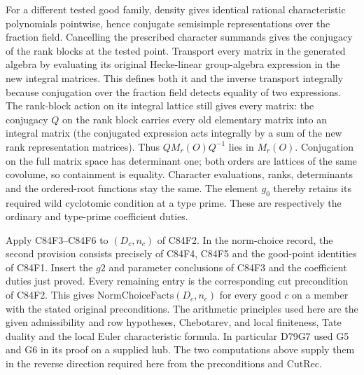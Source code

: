 For a different tested good family, density gives identical
rational characteristic polynomials pointwise, hence conjugate
semisimple representations over the fraction field. Cancelling
the prescribed character summands gives the conjugacy of the
rank blocks at the tested point. Transport every matrix in the
generated algebra by evaluating its original Hecke-linear
group-algebra expression in the new integral matrices. This
defines both it and the inverse transport integrally because
conjugation over the fraction field detects equality of two
expressions. The rank-block action on its integral lattice
still gives every matrix: the conjugacy $Q$ on the rank block
carries every old elementary matrix into an integral matrix
(the conjugated expression acts integrally by a sum of the
new rank representation matrices). Thus $Q M_r(O)Q^{-1}$
lies in $M_r(O)$. Conjugation on the full matrix space has
determinant one; both orders are lattices of the same covolume,
so containment is equality. Character evaluations, ranks,
determinants and the ordered-root functions stay the same.
The element $g_0$ thereby retains its required wild cyclotomic
condition at a type prime. These are respectively the
ordinary and type-prime coefficient duties.

Apply C84F3--C84F6 to $(D_c,n_c)$ of C84F2. In the norm-choice
record, the second provision consists precisely of C84F4,
C84F5 and the good-point identities of C84F1. Insert the $g2$
and parameter conclusions of C84F3 and the coefficient duties
just proved. Every remaining entry is the corresponding cut
precondition of C84F2. This gives
$\mathrm{NormChoiceFacts}(D_c,n_c)$ for every good $c$ on a
member with the stated original preconditions. The arithmetic
principles used here are the given admissibility and row
hypotheses, Chebotarev, and local finiteness, Tate duality and
the local Euler characteristic formula. In particular D79G7
used G5 and G6 in its proof on a supplied hub. The two
computations above supply them in the reverse direction
required here from the preconditions and $\mathrm{CutRec}$.
